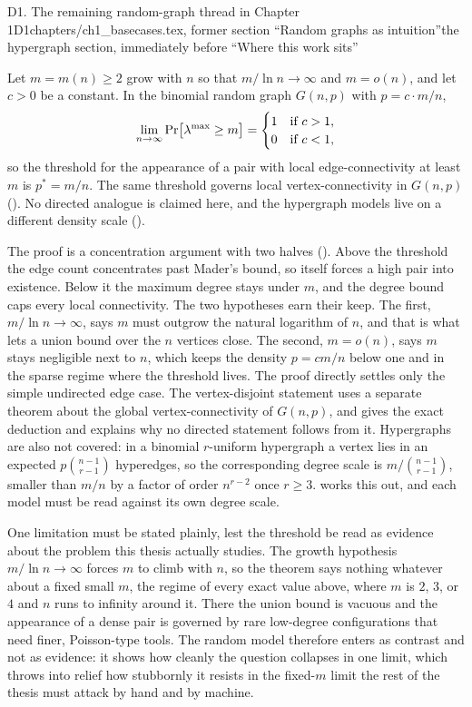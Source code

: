 \begin{offcut}{D1. The remaining random-graph thread in Chapter 1}{D1}{chapters/ch1\_basecases.tex, former section ``Random graphs as intuition''}{the hypergraph section, immediately before ``Where this work sits''}
\begin{theorem}\label{thm:gnp-threshold}
Let $m = m(n) \ge 2$ grow with $n$ so that $m / \ln n \to \infty$ and $m = o(n)$, and let $c > 0$ be a constant. In the binomial random graph $G(n, p)$ with $p = c \cdot m / n$,
\[
\lim_{n \to \infty} \Pr\bigl[\lambda^{\max} \ge m\bigr] =
\begin{cases}
1 & \text{if } c > 1,\\
0 & \text{if } c < 1,
\end{cases}
\]
so the threshold for the appearance of a pair with local edge-connectivity at least $m$ is $p^* = m/n$. The same threshold governs local vertex-connectivity in $G(n,p)$ (). No directed analogue is claimed here, and the hypergraph models live on a different density scale ().
\end{theorem}

The proof is a concentration argument with two halves (). Above the threshold the edge count concentrates past Mader's bound, so  itself forces a high pair into existence. Below it the maximum degree stays under $m$, and the degree bound caps every local connectivity. The two hypotheses earn their keep. The first, $m/\ln n \to \infty$, says $m$ must outgrow the natural logarithm of $n$, and that is what lets a union bound over the $n$ vertices close. The second, $m = o(n)$, says $m$ stays negligible next to $n$, which keeps the density $p = cm/n$ below one and in the sparse regime where the threshold lives. The proof directly settles only the simple undirected edge case. The vertex-disjoint statement uses a separate theorem about the global vertex-connectivity of $G(n,p)$, and  gives the exact deduction and explains why no directed statement follows from it. Hypergraphs are also not covered: in a binomial $r$-uniform hypergraph a vertex lies in an expected $p\binom{n-1}{r-1}$ hyperedges, so the corresponding degree scale is $m/\binom{n-1}{r-1}$, smaller than $m/n$ by a factor of order $n^{r-2}$ once $r \ge 3$.  works this out, and each model must be read against its own degree scale.

One limitation must be stated plainly, lest the threshold be read as evidence about the problem this thesis actually studies. The growth hypothesis $m / \ln n \to \infty$ forces $m$ to climb with $n$, so the theorem says nothing whatever about a fixed small $m$, the regime of every exact value above, where $m$ is $2$, $3$, or $4$ and $n$ runs to infinity around it. There the union bound is vacuous and the appearance of a dense pair is governed by rare low-degree configurations that need finer, Poisson-type tools. The random model therefore enters as contrast and not as evidence: it shows how cleanly the question collapses in one limit, which throws into relief how stubbornly it resists in the fixed-$m$ limit the rest of the thesis must attack by hand and by machine.
\end{offcut}

